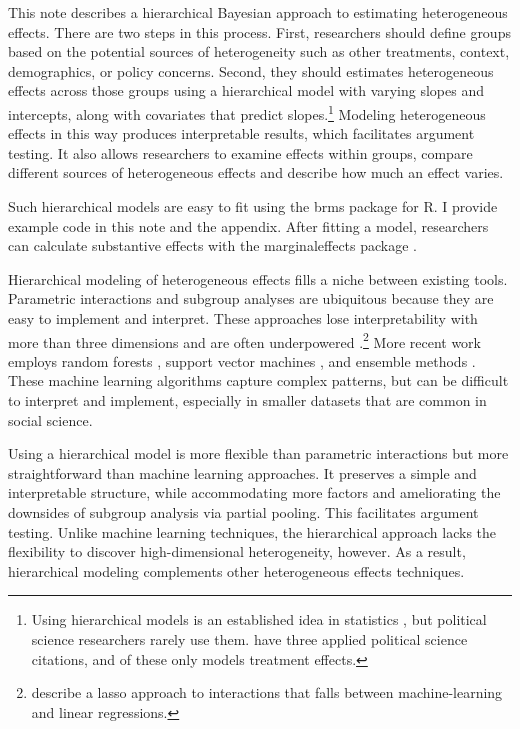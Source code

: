 \documentclass[12pt]{article}
\begin{document}
This note describes a hierarchical Bayesian approach to estimating heterogeneous effects. 
There are two steps in this process. 
First, researchers should define groups based on the potential sources of heterogeneity such as other treatments, context, demographics, or policy concerns. 
Second, they should estimates heterogeneous effects across those groups using a hierarchical model with varying slopes and intercepts, along with covariates that predict slopes.\footnote{Using hierarchical models is an established idea in statistics \citep{FellerGelman2015}, but political science researchers rarely use them. \citet{FellerGelman2015} have three applied political science citations, and of these only \citet{Marquardt2022} models treatment effects.} 
Modeling heterogeneous effects in this way produces interpretable results, which facilitates argument testing.
It also allows researchers to examine effects within groups, compare different sources of heterogeneous effects and describe how much an effect varies.  


Such hierarchical models are easy to fit using the brms package for \textsf{R}. 
I provide example code in this note and the appendix.
After fitting a model, researchers can calculate substantive effects with the marginaleffects package \citep{ArelBundockme}.


Hierarchical modeling of heterogeneous effects fills a niche between existing tools.
Parametric interactions and subgroup analyses are ubiquitous because they are easy to implement and interpret.
These approaches lose interpretability with more than three dimensions and are often underpowered \citep{Simmonsetal2011}.\footnote{\citet{BlackwellOlson2022} describe a lasso approach to interactions that falls between machine-learning and linear regressions.}
More recent work employs random forests \citep{GreenKern2012, WagerAthey2018}, support vector machines \citep{ImaiRatkovic2013}, and ensemble methods \citep{Grimmeretal2017, Kuenzeletal2019, Dorieetal2022}.
These machine learning algorithms capture complex patterns, but can be difficult to interpret and implement, especially in smaller datasets that are common in social science. 

 
Using a hierarchical model is more flexible than parametric interactions but more straightforward than machine learning approaches.  
It preserves a simple and interpretable structure, while accommodating more factors and ameliorating the downsides of subgroup analysis via partial pooling. 
This facilitates argument testing.
Unlike machine learning techniques, the hierarchical approach lacks the flexibility to discover high-dimensional heterogeneity, however.  
As a result, hierarchical modeling complements other heterogeneous effects techniques. 
\end{document}
